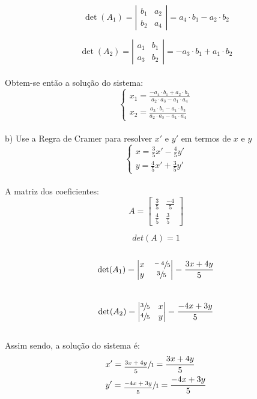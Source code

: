 \[
    \det(A_1) =
    \left|\begin{matrix}
        b_1 & a_2 \\
        b_2 & a_4
    \end{matrix}\right|
    =a_4\cdot b_1-a_2\cdot b_2
\]

\[
    \det(A_2) =
    \left|\begin{matrix}
        a_1 & b_1 \\
        a_3 & b_2
    \end{matrix}\right|
    =-a_3\cdot b_1+a_1\cdot b_2
\]
\\

Obtem-se então a solução do sistema:
\\

\[
    \begin{cases}
        x_1 = \frac{-a_4\cdot b_1+a_2\cdot b_2}{a_2\cdot a_3-a_1\cdot a_4} \\
        x_2 = \frac{a_3\cdot b_1-a_1\cdot b_2}{a_2\cdot a_3-a_1\cdot a_4}
    \end{cases}
\]
\\

b) Use a Regra de Cramer para resolver $x'$ e $y'$ em termos de $x$ e $y$
\\


\[
    \begin{cases}
        x= \frac{3}{5}x' -\frac{4}{5}y' \\
        y = \frac{4}{5}x'  +\frac{3}{5}y'
    \end{cases}
\]
\\

A matriz dos coeficientes:
\\

\[
    A=
    \begin{bmatrix}
        \frac{3}{5} & \frac{-4}{5} \\
        \frac{4}{5} & \frac{3}{5}
    \end{bmatrix}
\]

\[
    det(A)=1
\]
\\

\[
    \det(A_1) =
    \left|\begin{matrix}
        x & \sfrac{-4}{5} \\
        y & \sfrac{3}{5}
    \end{matrix}\right|
    = \frac{3x+4y}{5}
\]
\\

\[
    \det(A_2) =
    \left|\begin{matrix}
        \sfrac{3}{5} & x \\
        \sfrac{4}{5} & y
    \end{matrix}\right|
    = \frac{-4x+3y}{5}
\]
\\

Assim sendo, a solução do sistema é:
\\

\begin{equation}
    \begin{aligned}
         & x' = \sfrac{\frac{3x+4y}{5}}{1} = \frac{3x+4y}{5}   \\
         & y' = \sfrac{\frac{-4x+3y}{5}}{1} = \frac{-4x+3y}{5}
    \end{aligned}
\end{equation}

